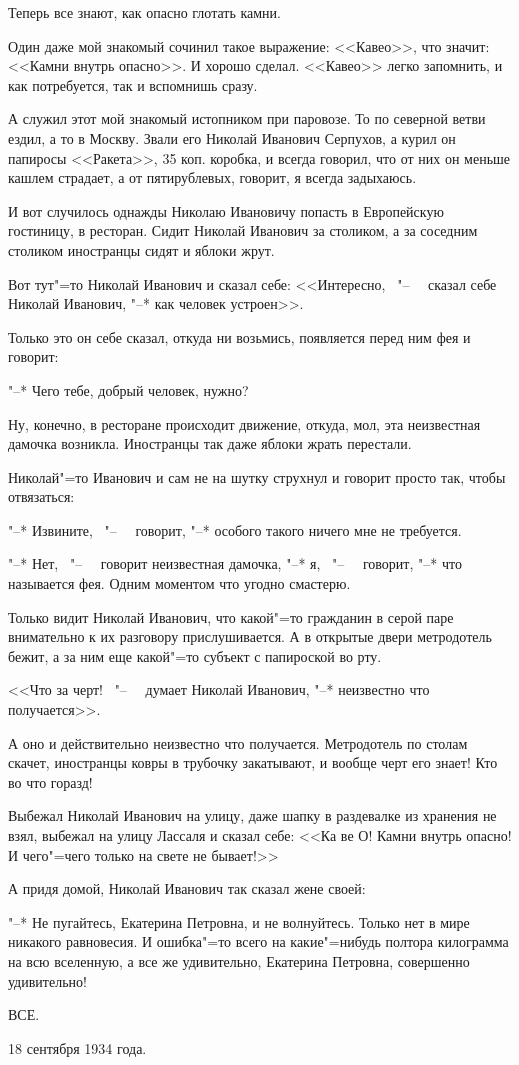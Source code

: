     Теперь все знают, как опасно глотать камни.

    Один даже мой знакомый сочинил такое выражение: <<Кавео>>, что значит: <<Камни  внутрь опасно>>.  И хорошо сделал. <<Кавео>> легко запомнить, и как потребуется,  так и вспомнишь сразу.

    А служил этот  мой  знакомый  истопником при паровозе. То по северной ветви  ездил, а то в Москву. Звали его Николай Иванович Серпухов, а курил он папиросы <<Ракета>>, 35 коп. коробка, и всегда говорил,  что  от  них  он меньше кашлем страдает,  а от  пятирублевых, говорит, я всегда задыхаюсь.

    И  вот случилось однажды Николаю  Ивановичу попасть в Европейскую гостиницу,  в ресторан. Сидит Николай Иванович за  столиком, а за соседним столиком  иностранцы  сидят  и яблоки жрут.

    Вот  тут"=то  Николай Иванович  и  сказал себе: <<Интересно, \ "--~ \ сказал себе Николай Иванович, "--* как человек устроен>>.

    Только  это он  себе сказал,  откуда  ни возьмись, появляется перед  ним фея и  говорит:

    "--* Чего тебе, добрый человек, нужно?
    
    Ну, конечно, в ресторане происходит движение, откуда, мол, эта неизвестная  дамочка возникла.  Иностранцы  так даже яблоки жрать перестали.

    Николай"=то  Иванович  и сам не на  шутку струхнул  и говорит просто так,  чтобы отвязаться:

    "--* Извините, \ "--~ \ говорит, "--*  особого такого ничего мне не требуется.

    "--* Нет, \ "--~ \  говорит неизвестная дамочка, "--* я, \ "--~ \ говорит,  "--*  что называется фея.  Одним моментом что угодно смастерю.

    Только видит Николай Иванович,  что  какой"=то гражданин  в серой паре внимательно к их разговору  прислушивается. А  в  открытые двери метродотель бежит, а за ним еще какой"=то субъект с папироской во рту.

    <<Что за черт! \ "--~ \ думает Николай Иванович, "--* неизвестно что получается>>.

    А оно и действительно неизвестно что получается. Метродотель по столам скачет, иностранцы ковры в трубочку закатывают, и вообще черт его знает! Кто во что горазд!

    Выбежал Николай Иванович на улицу,  даже шапку в раздевалке  из хранения не взял, выбежал на улицу Лассаля и сказал себе: <<Ка ве О! Камни внутрь опасно!  И чего"=чего  только на свете не бывает!>>

    А придя домой, Николай Иванович так сказал жене своей:

    "--* Не пугайтесь, Екатерина Петровна, и не волнуйтесь. Только нет  в мире никакого равновесия. И ошибка"=то  всего  на какие"=нибудь полтора килограмма на  всю вселенную,  а все же удивительно, Екатерина  Петровна,  совершенно удивительно!

    ВСЕ.
    
\begin{flushright}
18 сентября 1934 года.
\end{flushright}